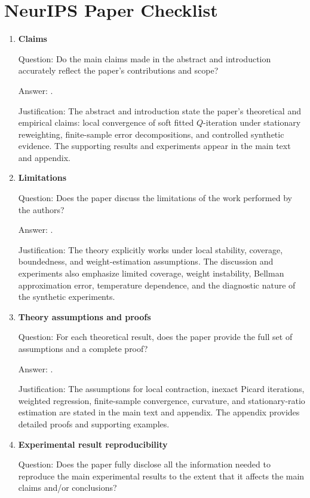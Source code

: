 \documentclass{article}
\theoremstyle{plain}
\theoremstyle{definition}
\theoremstyle{remark}
\begin{document}
\clearpage

\section*{NeurIPS Paper Checklist}

\begin{enumerate}[leftmargin=5mm]
\item \textbf{Claims}

Question: Do the main claims made in the abstract and introduction accurately
reflect the paper's contributions and scope?

Answer: \answerYes{}.

Justification: The abstract and introduction state the paper's theoretical and
empirical claims: local convergence of soft fitted \(Q\)-iteration under
stationary reweighting, finite-sample error decompositions, and controlled
synthetic evidence. The supporting results and experiments appear in the main
text and appendix.

\item \textbf{Limitations}

Question: Does the paper discuss the limitations of the work performed by the
authors?

Answer: \answerYes{}.

Justification: The theory explicitly works under local stability, coverage,
boundedness, and weight-estimation assumptions. The discussion and experiments
also emphasize limited coverage, weight instability, Bellman approximation
error, temperature dependence, and the diagnostic nature of the synthetic
experiments.

\item \textbf{Theory assumptions and proofs}

Question: For each theoretical result, does the paper provide the full set of
assumptions and a complete proof?

Answer: \answerYes{}.

Justification: The assumptions for local contraction, inexact Picard
iterations, weighted regression, finite-sample convergence, curvature, and
stationary-ratio estimation are stated in the main text and appendix. The
appendix provides detailed proofs and supporting examples.

\item \textbf{Experimental result reproducibility}

Question: Does the paper fully disclose all the information needed to reproduce
the main experimental results to the extent that it affects the main claims
and/or conclusions?


\end{enumerate}
\end{document}
